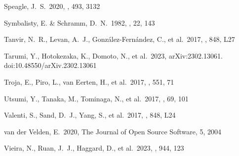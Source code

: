 \documentclass[twocolumn,twocolappendix]{aastex63}
\begin{document}
\begin{thebibliography}{}
 Speagle, J.~S.\ 2020, \mnras, 493, 3132

 Symbalisty, E. \& Schramm, D.~N.\ 1982, \aplett, 22, 143












 Tanvir, N.~R., Levan, A.~J., Gonz{\'a}lez-Fern{\'a}ndez, C., et al.\ 2017, \apjl, 848, L27




 Tarumi, Y., Hotokezaka, K., Domoto, N., et al.\ 2023, arXiv:2302.13061. doi:10.48550/arXiv.2302.13061


 Troja, E., Piro, L., van Eerten, H., et al.\ 2017, \nat, 551, 71


 Utsumi, Y., Tanaka, M., Tominaga, N., et al.\ 2017, \pasj, 69, 101


 Valenti, S., Sand, D.~J., Yang, S., et al.\ 2017, \apjl, 848, L24


 van der Velden, E.\ 2020, The Journal of Open Source Software, 5, 2004




 Vieira, N., Ruan, J.~J., Haggard, D., et al.\ 2023, \apj, 944, 123


\end{thebibliography}
\end{document}
